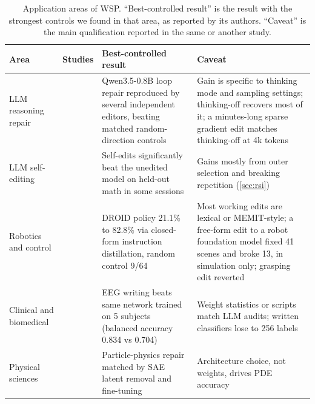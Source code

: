 \begin{table}[p]
\centering
\footnotesize
\setlength{\tabcolsep}{3pt}
\caption{Application areas of WSP. ``Best-controlled result'' is the result with the strongest controls we found in that area, as reported by its authors. ``Caveat'' is the main qualification reported in the same or another study.}
\label{tab:apps}
\begin{tabularx}{\linewidth}{>{\raggedright\arraybackslash}p{2.4cm} >{\raggedright\arraybackslash}p{3.1cm} >{\raggedright\arraybackslash}X >{\raggedright\arraybackslash}X}
\toprule
Area & Studies & Best-controlled result & Caveat \\
\midrule
LLM reasoning repair & \citep{takehi2026sparks,ax2611_09382,ax2611_20953,zen24036186,zen24208534,zen24416417,ax2611_27089,ax2611_20566,ax2611_33133} & Qwen3.5-0.8B loop repair reproduced by several independent editors, beating matched random-direction controls \citep{zen24416417,zen24373917} & Gain is specific to thinking mode and sampling settings; thinking-off recovers most of it; a minutes-long sparse gradient edit matches thinking-off at 4k tokens \citep{zen24373917,zen24058693,zen24036186,ax2611_33133} \\
LLM self-editing & \citep{ax2611_21885,ax2611_28833,ax2611_29513,ax2611_31117} & Self-edits significantly beat the unedited model on held-out math in some sessions \citep{ax2611_21885,ax2611_28833} & Gains mostly from outer selection and breaking repetition (\cref{sec:rsi}) \\
Robotics and control & \citep{ax2611_09376,ax2611_11894,ax2611_18919,ax2611_21958,ax2611_11604,ax2611_31715} & DROID policy 21.1\% to 82.8\% via closed-form instruction distillation, random control 9/64 \citep{ax2611_11894} & Most working edits are lexical or MEMIT-style; a free-form edit to a robot foundation model fixed 41 scenes and broke 13, in simulation only; grasping edit reverted \citep{ax2611_09376,ax2611_31715,ax2611_18919} \\
Clinical and biomedical & \citep{ax2611_05341,ax2611_07847,ax2611_24877,ax2611_12066,ax2611_13758,zen24040591} & EEG writing beats same network trained on 5 subjects (balanced accuracy 0.834 vs 0.704) \citep{ax2611_13758} & Weight statistics or scripts match LLM audits; written classifiers lose to 256 labels \citep{ax2611_05341,ax2611_24877,ax2611_12066} \\
Physical sciences & \citep{ax2611_12954,ax2611_27079,ax2611_22013,ax2611_07319,ax2611_23718,ax2611_11537,ax2611_17246,ax2611_23875} & Particle-physics repair matched by SAE latent removal and fine-tuning \citep{ax2611_27079} & Architecture choice, not weights, drives PDE accuracy \citep{ax2611_12954} \\

\end{tabularx}
\end{table}
